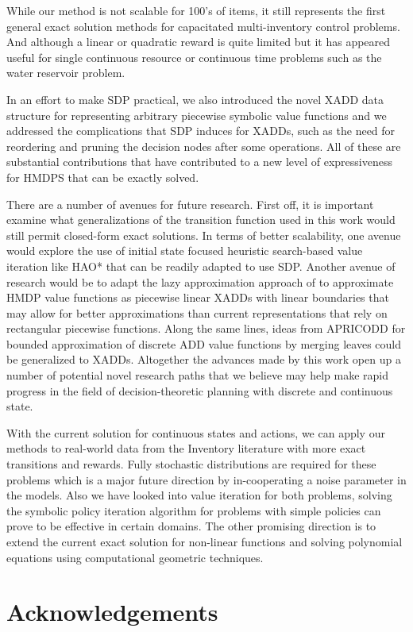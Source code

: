 \documentclass[twoside,11pt]{article}
\begin{document}
While our method is not scalable for 100's of items, it still represents
the first general exact solution methods for capacitated multi-inventory control problems. 
And although a linear or quadratic reward is quite limited but it has appeared useful for single continuous resource or continuous time problems such as the water reservoir problem. 

In an effort to make SDP practical, we also introduced
the novel XADD data structure for representing arbitrary piecewise
symbolic value functions and we addressed the complications that
SDP induces for XADDs, such as the need for reordering and pruning the decision
nodes after some operations.  All of these are substantial contributions
that have contributed to a new level of expressiveness for HMDPS
that can be exactly solved.

There are a number of avenues for future research.  First off, it is
important examine what generalizations of the transition function used
in this work would still permit closed-form exact solutions.  In terms
of better scalability, one avenue would explore the use of initial
state focused heuristic search-based value iteration like
HAO* \cite{hao09} that can be readily adapted to use SDP.  Another
avenue of research would be to adapt the lazy approximation approach
of \cite{li05} to approximate HMDP value functions as piecewise
linear XADDs with linear boundaries that may allow for better
approximations than current representations that rely on rectangular
piecewise functions.  Along the same lines, ideas from
APRICODD \cite{apricodd} for bounded approximation of discrete ADD
value functions by merging leaves could be generalized to XADDs.
Altogether the advances made by this work open up a number of
potential novel research paths that we believe may help make
rapid progress in the field of decision-theoretic planning
with discrete and continuous state.

With the current solution for continuous states and actions, we can apply our methods to real-world data from the Inventory literature with more exact transitions and rewards. Fully stochastic distributions are required for these problems which is a major future direction by in-cooperating a noise parameter in the models. 
Also we have looked into value iteration for both problems, solving the symbolic policy iteration algorithm for problems with simple policies can prove to be effective in certain domains. 
The other promising direction is to extend the current exact solution for non-linear functions and solving polynomial equations using computational geometric techniques. 

\section*{Acknowledgements}


\vskip 0.2in


\end{document}
